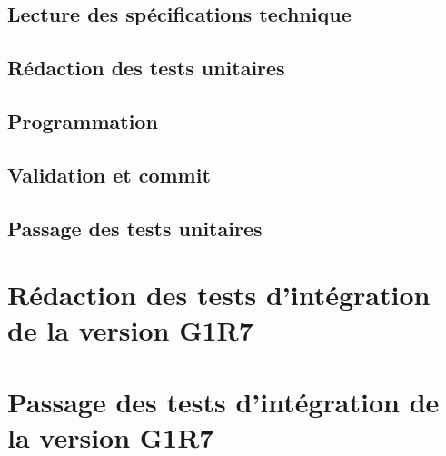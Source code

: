 \section{Lecture des spécifications technique}
\section{Rédaction des tests unitaires}
\section{Programmation}
\section{Validation et commit}
\section{Passage des tests unitaires}
\chapter{Rédaction des tests d'intégration de la version G1R7}
\chapter{Passage des tests d'intégration de la version G1R7}
